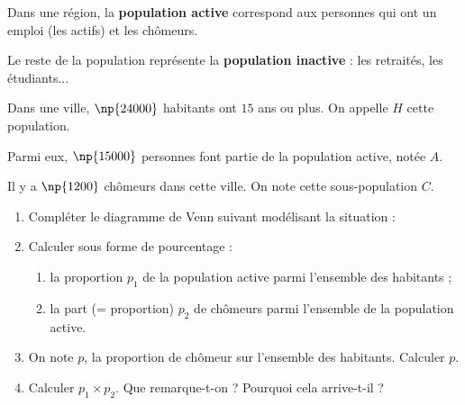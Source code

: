 \documentclass[10pt,openright,twoside,french]{book}
\begin{document}

Dans une région, la \textbf{population active} correspond aux personnes qui ont un emploi (les actifs) et les chômeurs.\par
Le reste de la population représente la \textbf{population inactive} : les retraités, les étudiants...

Dans une ville, $\np{24000}$ habitants ont $15$ ans ou plus. On appelle $H$ cette population.\par
Parmi eux, $\np{15000}$ personnes font partie de la population active, notée $A$.\par
Il y a $\np{1200}$ chômeurs dans cette ville. On note cette sous-population $C$.

\begin{enumerate}
    \item Compléter le diagramme de Venn suivant modélisant la situation :
    \begin{center}
    \end{center}
    \item Calculer sous forme de pourcentage :
    \begin{enumerate}
        \item la proportion $p_1$ de la population active parmi l'ensemble des habitants ;
        \item la part (= proportion) $p_2$ de chômeurs parmi l'ensemble de la population active.
    \end{enumerate}
    \item On note $p$, la proportion de chômeur sur l'ensemble des habitants. Calculer $p$.
    \item Calculer $p_1 \times p_2$. Que remarque-t-on ? Pourquoi cela arrive-t-il ?
\end{enumerate}
\end{document}

